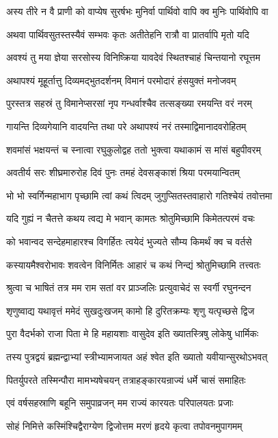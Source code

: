 \twolineshloka
{अस्य तीरे न वै प्राणी को वाप्येष सुरर्षभः}
{मुनिर्वा पार्थिवो वापि क्व मुनिः पार्थिवोपि वा}%

\twolineshloka
{अथवा पार्थिवसुतस्तस्यैवं सम्भवः कृतः}
{अतीतेहनि रात्रौ वा प्रातर्वापि मृतो यदि}%

\twolineshloka
{अवश्यं तु मया ज्ञेया सरसोस्य विनिष्क्रिया}
{यावदेवं स्थितश्चाहं चिन्तयानो रघूत्तम}%

\twolineshloka
{अथापश्यं मूहूर्तात्तु दिव्यमद्भुतदर्शनम्}
{विमानं परमोदारं हंसयुक्तं मनोजवम्}%

\twolineshloka
{पुरस्तत्र सहस्रं तु विमानेप्सरसां नृप}
{गन्धर्वाश्चैव तत्सङ्ख्या रमयन्ति वरं नरम्}%

\twolineshloka
{गायन्ति दिव्यगेयानि वादयन्ति तथा परे}
{अथापश्यं नरं तस्माद्विमानादवरोहितम्}%

\twolineshloka
{शवमांसं भक्षयन्तं च स्नात्वा रघुकुलोद्वह}
{ततो भुक्त्वा यथाकामं स मांसं बहुपीवरम्}%

\twolineshloka
{अवतीर्य सरः शीघ्रमारुरोह दिवं पुनः}
{तमहं देवसङ्काशं श्रिया परमयान्वितम्}%

\twolineshloka
{भो भो स्वर्गिन्महाभाग पृच्छामि त्वां कथं त्विदम्}
{जुगुप्सितस्तवाहारो गतिश्चेयं तवोत्तमा}%

\twolineshloka
{यदि गुह्यं न चैतत्ते कथय त्वद्य मे भवान्}
{कामतः श्रोतुमिच्छामि किमेतत्परमं वचः}%

\twolineshloka
{को भवान्वद सन्देहमाहारश्च विगर्हितः}
{त्वयेदं भुज्यते सौम्य किमर्थं क्व च वर्तसे}%

\twolineshloka
{कस्यायमैश्वरोभावः शवत्वेन विनिर्मितः}
{आहारं च कथं निन्द्यं श्रोतुमिच्छामि तत्त्वतः}%

\twolineshloka
{श्रुत्वा च भाषितं तत्र मम राम सतां वर}
{प्राञ्जलिः प्रत्युवाचेदं स स्वर्गी रघुनन्दन}%

\twolineshloka
{शृणुष्वाद्य यथावृत्तं ममेदं सुखदुःखजम्}
{कामो हि दुरितक्रम्यः शृणु यत्पृच्छसे द्विज}%

\twolineshloka
{पुरा वैदर्भको राजा पिता मे हि महायशाः}
{वासुदेव इति ख्यातस्त्रिषु लोकेषु धार्मिकः}%

\twolineshloka
{तस्य पुत्रद्वयं ब्रह्मन्द्वाभ्यां स्त्रीभ्यामजायत}
{अहं श्वेत इति ख्यातो यवीयान्सुरथोऽभवत्}%

\twolineshloka
{पितर्युपरते तस्मिन्पौरा मामभ्यषेचयन्}
{तत्राहङ्कारयन्राज्यं धर्मे चासं समाहितः}%

\twolineshloka
{एवं वर्षसहस्राणि बहूनि समुपाव्रजन्}
{मम राज्यं कारयतः परिपालयतः प्रजाः}%

\twolineshloka
{सोहं निमित्ते कस्मिंश्चिद्वैराग्येण द्विजोत्तम}
{मरणं हृदये कृत्वा तपोवनमुपागमम्}%

